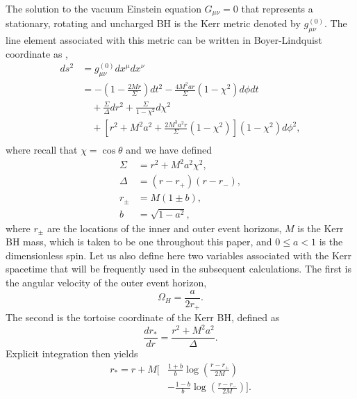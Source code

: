 \documentclass[aps,prx,amsmath,floats,floatfix,twocolumn,
  superscriptaddress,nofootinbib,showpacs]{revtex4-1}
\begin{document}
The solution to the vacuum Einstein equation $G_{\mu \nu} = 0$ that represents a stationary, rotating and uncharged BH is the Kerr metric denoted by $g_{\mu \nu}^{(0)}$. The line element associated with this metric can be written in Boyer-Lindquist coordinate
as \cite{Teukolsky:2014vca}, 
%
\begin{equation}\label{eq:metric}
\begin{split}
ds^2 &= g_{\mu \nu}^{(0)} dx^{\mu}  dx^{\nu} \\
& = - \left( 1-\frac{2 M r}{\Sigma} \right) dt^2 - \frac{4 M^2 a r}{\Sigma} (1 - \chi^2) d \phi dt \\
& \quad + \frac{\Sigma}{\Delta} dr^2 + \frac{\Sigma}{1 - \chi^2} d \chi^2 \\
& \quad + \left[r^{2} + M^2 a^{2}+\frac{2 M^3 a^{2} r}{\Sigma} (1 - \chi^2)\right](1-\chi^2) d\phi^2, \\
\end{split}
\end{equation}
where recall that $\chi = \cos{\theta}$ and we have defined
\begin{align} \label{eq:metric_quantities}
\Sigma &= r^2 + M^2 a^2 \chi^2, \nonumber\\
\Delta &= (r-r_+)(r-r_-), \nonumber\\
r_{\pm} &= M(1 \pm b), \nonumber\\
b & = \sqrt{1-a^2},
\end{align}
where $r_{\pm}$ are the locations of the inner and outer event horizons, $M$ is the Kerr BH mass, which is taken to be one throughout this paper, and $0\leq a<1$ is the dimensionless spin.
Let us also define here two variables associated with the Kerr spacetime that will be frequently used in the subsequent calculations. 
The first is the angular velocity of the outer event horizon, 
\begin{equation}
\Omega_H = \frac{a}{2r_+}. 
\end{equation}
The second is the tortoise coordinate of the Kerr BH, defined as \cite{Teukolsky_01_PRL, Teukolsky:1973ha, Teukolsky:1974yv}
\begin{equation}\label{eq:r_*}
\frac{d r_*}{d r} = \frac{r^2 + M^2 a^2}{\Delta}. 
\end{equation} 
Explicit integration then yields 
\begin{equation}
\begin{split}
r_* = r + M\Bigg[ & \frac{1+b}{b}\log\left( \frac{r-r_+}{2M}\right) \\
& - \frac{1-b}{b}\log\left( \frac{r-r_-}{2M}\right) \Bigg]. 
\end{split}
\end{equation}
\end{document}
